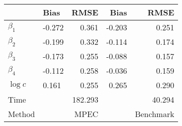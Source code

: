 
\begin{tabular}[t]{llrrr}
\toprule
  & Bias & RMSE & Bias & RMSE\\
\midrule
$\beta_{1}$ & -0.272 & 0.361 & -0.203 & 0.251\\
$\beta_{2}$ & -0.199 & 0.332 & -0.114 & 0.174\\
$\beta_{3}$ & -0.173 & 0.255 & -0.088 & 0.157\\
$\beta_{4}$ & -0.112 & 0.258 & -0.036 & 0.159\\
$\log c$ & 0.161 & 0.255 & 0.265 & 0.290\\
Time &  & 182.293 &  & 40.294\\
Method &  & MPEC &  & Benchmark\\
\bottomrule
\end{tabular}
